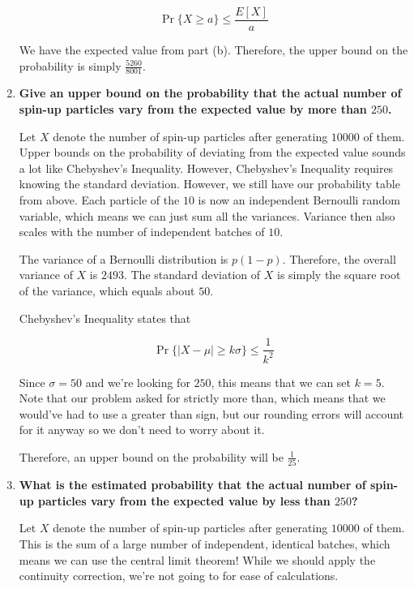 \documentclass{article}
\begin{document}
\begin{enumerate}[label=(\alph*)]
    $$\Pr\{X \geq a\} \leq \frac{E[X]}{a}$$
    
    We have the expected value from part (b). Therefore, the upper bound on the probability is simply $\boxed{\frac{5260}{8001}}$.

    \vspace{2cm}
    
    \item \textbf{Give an upper bound on the probability that the actual number of spin-up particles vary from the expected value by more than $250$.}
    
    Let $X$ denote the number of spin-up particles after generating $10000$ of them. Upper bounds on the probability of deviating from the expected value sounds a lot like Chebyshev's Inequality. However, Chebyshev's Inequality requires knowing the standard deviation. However, we still have our probability table from above. Each particle of the $10$ is now an independent Bernoulli random variable, which means we can just sum all the variances. Variance then also scales with the number of independent batches of $10$.
    
    The variance of a Bernoulli distribution is $p(1 - p)$. Therefore, the overall variance of $X$ is $2493$. The standard deviation of $X$ is simply the square root of the variance, which equals about $50$.
    
    Chebyshev's Inequality states that
    
    $$\Pr\{\vert X - \mu\vert \geq k \sigma\} \leq \frac{1}{k^2}$$
    
    Since $\sigma = 50$ and we're looking for $250$, this means that we can set $k = 5$. Note that our problem asked for strictly more than, which means that we would've had to use a greater than sign, but our rounding errors will account for it anyway so we don't need to worry about it.
    
    Therefore, an upper bound on the probability will be $\boxed{\frac{1}{25}}$.

    \vspace{2cm}
    
    \item \textbf{What is the estimated probability that the actual number of spin-up particles vary from the expected value by less than $250$?}
    
    Let $X$ denote the number of spin-up particles after generating $10000$ of them. This is the sum of a large number of independent, identical batches, which means we can use the central limit theorem! While we should apply the continuity correction, we're not going to for ease of calculations.
    

\end{enumerate}
\end{document}
